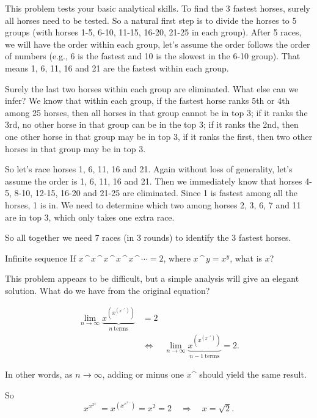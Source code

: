 \begin{solution}
This problem tests your basic analytical skills. To find the 3 fastest horses, surely all horses
need to be tested. So a natural first step is to divide the horses to 5 groups (with horses 1-5,
6-10, 11-15, 16-20, 21-25 in each group). After 5 races, we will have the order within each
group, let's assume the order follows the order of numbers (e.g., 6 is the fastest and 10 is the
slowest in the 6-10 group)\footnotemark[5]. That means 1, 6, 11, 16 and 21 are the fastest
within each group.

Surely the last two horses within each group are eliminated. What else can we infer? We know
that within each group, if the fastest horse ranks 5th or 4th among 25 horses, then all horses in
that group cannot be in top 3; if it ranks the 3rd, no other horse in that group can be in the top
3; if it ranks the 2nd, then one other horse in that group may be in top 3, if it ranks the first,
then two other horses in that group may be in top 3.


So let's race horses 1, 6, 11, 16 and 21. Again without loss of generality, let's assume the
order is 1, 6, 11, 16 and 21. Then we immediately know that horses 4-5, 8-10, 12-15, 16-20
and 21-25 are eliminated. Since 1 is fastest among all the horses, 1 is in. We need to determine
which two among horses 2, 3, 6, 7 and 11 are in top 3, which only takes one extra race.

So all together we need 7 races (in 3 rounds) to identify the 3 fastest horses.
\end{solution}

\begin{problem}{Infinite sequence}
If \(x\mathbin{\text{\textasciicircum}}x\mathbin{\text{\textasciicircum}}x
\mathbin{\text{\textasciicircum}}x\mathbin{\text{\textasciicircum}}x
\mathbin{\text{\textasciicircum}}\cdots=2\), where
\(x\mathbin{\text{\textasciicircum}}y=x^y\), what is \(x\)?
\end{problem}

\begin{solution}
This problem appears to be difficult, but a simple analysis will give an elegant solution. What
do we have from the original equation?

\[
\begin{aligned}
\lim_{n\to\infty}
  \underbrace{x^{\left(x^{\left(x^{\cdots^x}\right)}\right)}}_{n\ \mathrm{terms}}
  &=2\\
  &\Longleftrightarrow\quad
  \lim_{n\to\infty}
  \underbrace{x^{\left(x^{\left(x^{\cdots^x}\right)}\right)}}_{n-1\ \mathrm{terms}}
  =2.
\end{aligned}
\]

In other words, as \(n\to\infty\), adding or minus one
\(x\mathbin{\text{\textasciicircum}}\) should yield the same result.

So
\[
x^{x^{x^{x^{\cdots}}}}=x^{\left(x^{x^{x^{\cdots}}}\right)}=x^2=2
\quad\Longrightarrow\quad x=\sqrt{2}.
\]
\end{solution}

